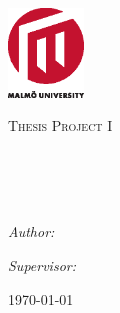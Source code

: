 \begin{titlepage}
\begin{center}

\AddToShipoutPicture*{\BackgroundPic}

\includegraphics[width=0.15\textwidth]{./img/mah2.eps}~\\[1cm]

\begin{minipage}{0.8\textwidth}
\begin{flushleft} \large
\textsc{\Large Thesis Project I}\\[0.5cm]
\HRule \\[0.4cm]
{ \huge \bfseries \titel \\[0.4cm] }
\end{flushleft}
\end{minipage}




\HRule \\[1.5cm]

\begin{minipage}{0.4\textwidth}
\begin{flushleft} \large
\emph{Author:}\\
\autor
\end{flushleft}
\end{minipage}
\begin{minipage}{0.4\textwidth}
\begin{flushright} \large
\emph{Supervisor:} \\
\supervisor
\end{flushright}
\end{minipage}

\vfill

{\large \today}

\end{center}
\end{titlepage}
